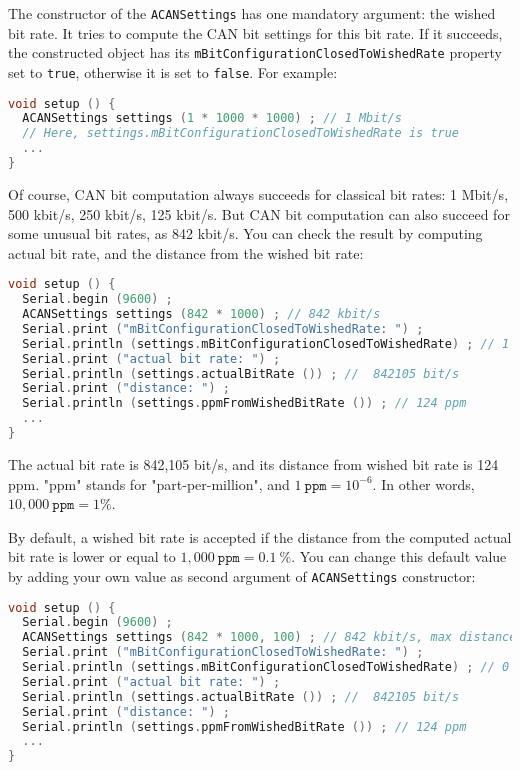 \documentclass[10pt, a4paper, obeyspaces, openany]{extarticle}
\begin{document}
The constructor of the \texttt{ACANSettings} has one mandatory argument: the wished bit rate. It tries to compute the CAN bit settings for this bit rate. If it succeeds, the constructed object has its \texttt{mBitConfigurationClosedToWishedRate} property set to \texttt{true}, otherwise it is set to \texttt{false}. For example:
{ \small\begin{lstlisting}[language=c++]
void setup () {
  ACANSettings settings (1 * 1000 * 1000) ; // 1 Mbit/s
  // Here, settings.mBitConfigurationClosedToWishedRate is true
  ...
}
\end{lstlisting}}

Of course, CAN bit computation always succeeds for classical bit rates: 1 Mbit/s, 500 kbit/s, 250 kbit/s, 125 kbit/s. But CAN bit computation can also succeed for some unusual bit rates, as 842 kbit/s. You can check the result by computing actual bit rate, and the distance from the wished bit rate:
{ \small\begin{lstlisting}[language=c++]
void setup () {
  Serial.begin (9600) ;
  ACANSettings settings (842 * 1000) ; // 842 kbit/s
  Serial.print ("mBitConfigurationClosedToWishedRate: ") ;
  Serial.println (settings.mBitConfigurationClosedToWishedRate) ; // 1 (--> is true)
  Serial.print ("actual bit rate: ") ;
  Serial.println (settings.actualBitRate ()) ; //  842105 bit/s
  Serial.print ("distance: ") ;
  Serial.println (settings.ppmFromWishedBitRate ()) ; // 124 ppm
  ...
}
\end{lstlisting}}

The actual bit rate is 842,105 bit/s, and its distance from wished bit rate is 124 ppm. "ppm" stands for "part-per-million", and $1~\texttt{ppm} = 10^{-6}$. In other words, $10,000~\texttt{ppm}=1\%$.


By default, a wished bit rate is accepted if the distance from the computed actual bit rate is lower or equal to $1,000~\texttt{ppm} = 0.1~\%$. You can change this default value by adding your own value as second argument of \texttt{ACANSettings} constructor:
{ \small\begin{lstlisting}[language=c++]
void setup () {
  Serial.begin (9600) ;
  ACANSettings settings (842 * 1000, 100) ; // 842 kbit/s, max distance is 100 ppm
  Serial.print ("mBitConfigurationClosedToWishedRate: ") ;
  Serial.println (settings.mBitConfigurationClosedToWishedRate) ; // 0 (--> is false)
  Serial.print ("actual bit rate: ") ;
  Serial.println (settings.actualBitRate ()) ; //  842105 bit/s
  Serial.print ("distance: ") ;
  Serial.println (settings.ppmFromWishedBitRate ()) ; // 124 ppm
  ...
}
\end{lstlisting}}
\end{document}

